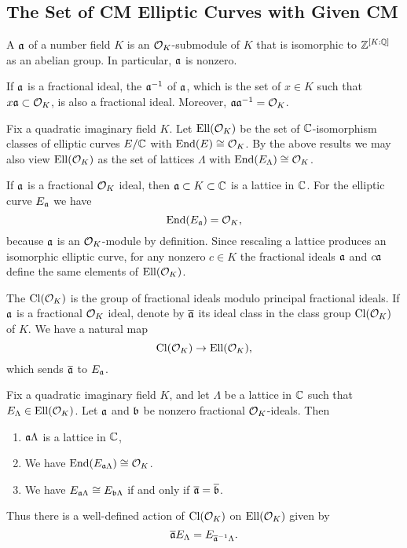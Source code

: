 \subsection{The Set of CM Elliptic Curves with Given CM}
\begin{definition}
A  $\mathfrak{a}$ of a number field $K$
is an $\mathcal{O}_K$-submodule of $K$ that is isomorphic
to $\mathbb{Z}^{[K:\mathbb{Q}]}$ as an abelian group.  In particular,
$\mathfrak{a}$ is nonzero. 
\end{definition}
If $\mathfrak{a}$ is a fractional ideal, the  $\mathfrak{a}^{-1}$
of $\mathfrak{a}$, which is the set of $x \in K$ such that $x\mathfrak{a} \subset \mathcal{O}_K$,
is also a fractional ideal.  Moreover, $\mathfrak{a} \mathfrak{a}^{-1} = \mathcal{O}_K$.


Fix a quadratic imaginary field $K$.
Let $\operatorname{Ell}(\mathcal{O}_K)$ be the set of $\mathbb{C}$-isomorphism
classes of elliptic curves $E/\mathbb{C}$ with 
$\operatorname{End}(E)\cong \mathcal{O}_K$.  By the above results
we may also view $\operatorname{Ell}(\mathcal{O}_K)$ as the set
of lattices $\Lambda$ with $\operatorname{End}(E_{\Lambda}) \cong \mathcal{O}_K$.

If $\mathfrak{a}$ is a fractional $\mathcal{O}_K$ ideal,
then $\mathfrak{a}\subset K\subset \mathbb{C}$ is a lattice in $\mathbb{C}$.
For the elliptic curve $E_{\mathfrak{a}}$ we have
$$
 \operatorname{End}(E_{\mathfrak{a}}) = \mathcal{O}_K,
$$
because $\mathfrak{a}$ is an $\mathcal{O}_K$-module by definition.
Since rescaling a lattice produces an isomorphic
elliptic curve, for any nonzero $c\in K$
the fractional ideals $\mathfrak{a}$
and $c\mathfrak{a}$ define the same elements of $\operatorname{Ell}(\mathcal{O}_K)$.

 The  $\operatorname{Cl}(\mathcal{O}_K)$ is the group
of fractional ideals modulo principal fractional ideals. 
If $\mathfrak{a}$ is a fractional $\mathcal{O}_K$ ideal,
denote by $\overline{\mathfrak{a}}$ its ideal class in the class
group $\operatorname{Cl}(\mathcal{O}_K)$ of $K$. 
We have a natural map
$$
  \operatorname{Cl}(\mathcal{O}_K) \to \operatorname{Ell}(\mathcal{O}_K),
$$
which sends $\overline{\mathfrak{a}}$ to $E_{\mathfrak{a}}$.

\begin{theorem}
Fix a quadratic imaginary field $K$, and
let $\Lambda$ be a lattice in $\mathbb{C}$ such
that $E_{\Lambda} \in \operatorname{Ell}(\mathcal{O}_K)$.  Let $\mathfrak{a}$
and $\mathfrak{b}$ be nonzero fractional $\mathcal{O}_K$-ideals.
Then 
\begin{enumerate}
\item $\mathfrak{a} \Lambda$ is a lattice in $\mathbb{C}$,
\item We have $\operatorname{End}(E_{\mathfrak{a} \Lambda}) \cong \mathcal{O}_K$.
\item We have $E_{\mathfrak{a}\Lambda}\cong E_{\mathfrak{b}\Lambda}$
if and only if $\overline{\mathfrak{a}} = \overline{\mathfrak{b}}$.
\end{enumerate}
Thus there is a well-defined action of $\operatorname{Cl}(\mathcal{O}_K)$
on $\operatorname{Ell}(\mathcal{O}_K)$ given by 
$$
  \overline{\mathfrak{a}} E_{\Lambda} = E_{\overline{\mathfrak{a}}^{-1} \Lambda}.
$$
\end{theorem}


